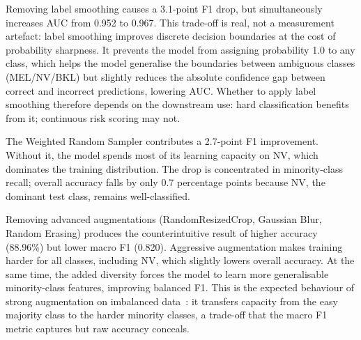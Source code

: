 Removing label smoothing causes a 3.1-point F1 drop, but simultaneously increases AUC from 0.952 to 0.967. This trade-off is real, not a measurement artefact: label smoothing improves discrete decision boundaries at the cost of probability sharpness. It prevents the model from assigning probability 1.0 to any class, which helps the model generalise the boundaries between ambiguous classes (MEL/NV/BKL) but slightly reduces the absolute confidence gap between correct and incorrect predictions, lowering AUC. Whether to apply label smoothing therefore depends on the downstream use: hard classification benefits from it; continuous risk scoring may not.

The Weighted Random Sampler contributes a 2.7-point F1 improvement. Without it, the model spends most of its learning capacity on NV, which dominates the training distribution. The drop is concentrated in minority-class recall; overall accuracy falls by only 0.7 percentage points because NV, the dominant test class, remains well-classified.

Removing advanced augmentations (RandomResizedCrop, Gaussian Blur, Random Erasing) produces the counterintuitive result of higher accuracy (88.96\%) but lower macro F1 (0.820). Aggressive augmentation makes training harder for all classes, including NV, which slightly lowers overall accuracy. At the same time, the added diversity forces the model to learn more generalisable minority-class features, improving balanced F1. This is the expected behaviour of strong augmentation on imbalanced data~\cite{shorten2019survey}: it transfers capacity from the easy majority class to the harder minority classes, a trade-off that the macro F1 metric captures but raw accuracy conceals.
